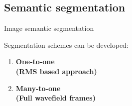 \documentclass[10pt,aspectratio=169]{beamer} %
\begin{document}
\subsection{Semantic segmentation}
\setcounter{subfigure}{0}
\begin{frame}{Image semantic segmentation}
	\begin{minipage}[l]{0.35\textwidth}
		Segmentation schemes can be developed:
		\medskip
		\begin{enumerate}
			\item \textbf{One-to-one \\(RMS based approach)} 
			\medskip
			\item \textbf{Many-to-one \\(Full wavefield frames)}
		\end{enumerate}
	\end{minipage}
	\begin{minipage}[l]{0.6\textwidth}
		\begin{figure}
			\centering
			\qquad
			\qquad
			\\
			\qquad
			
		\end{figure}
	\end{minipage}
\end{frame}

\setcounter{subfigure}{0}
\end{document}
